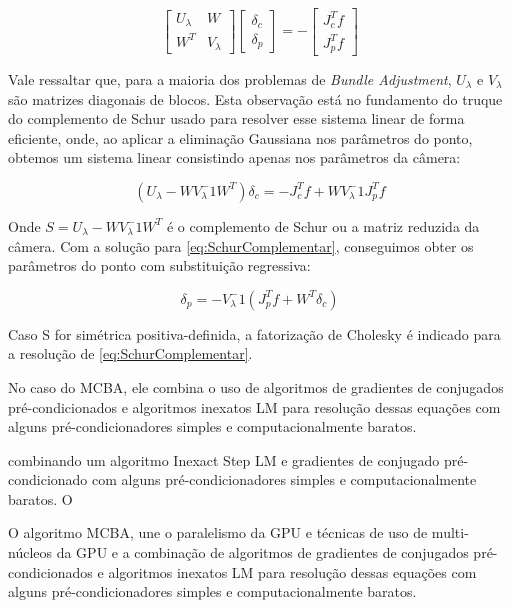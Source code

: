 \begin{itemize}
\[
\begin{bmatrix}
U_\lambda & W \\
W^T & V_\lambda 
\end{bmatrix}
\begin{bmatrix}
\delta_c\\ 
\delta_p
\end{bmatrix} =
-\begin{bmatrix}
J_c^T f\\ 
J_p^T f
\end{bmatrix}
\]

Vale ressaltar que, para a maioria dos problemas de \textit{Bundle Adjustment}, $U_\lambda$ e $V_\lambda$ são matrizes diagonais de blocos. Esta observação está no fundamento do truque do complemento de Schur usado para resolver esse sistema linear de forma eficiente, onde, ao aplicar a eliminação Gaussiana nos parâmetros do ponto, obtemos um sistema linear consistindo apenas nos parâmetros da câmera:

\begin{equation}
\label{eq:SchurComplementar}
(U_\lambda - W V_\lambda^-1 W^T)\delta_c = -J_c^T f + WV_\lambda^-1 J_p^T f
\end{equation}

Onde $S = U_\lambda - W V_\lambda^-1 W^T$ é o complemento de Schur ou a matriz reduzida da câmera. Com a solução para \ref{eq:SchurComplementar}, conseguimos obter os parâmetros do ponto com substituição regressiva:

\begin{equation}
\delta_p = -V_\lambda^-1(J_p^T f + W^T \delta_c)
\end{equation}

Caso S for simétrica positiva-definida, a fatorização de Cholesky é indicado para a resolução de \ref{eq:SchurComplementar}. 

No caso do MCBA, ele combina o uso de algoritmos de gradientes de conjugados pré-condicionados e algoritmos inexatos LM para resolução dessas equações  com alguns pré-condicionadores simples e computacionalmente baratos. 

combinando um algoritmo Inexact Step LM e gradientes de conjugado pré-condicionado com alguns pré-condicionadores simples e computacionalmente baratos. O

O algoritmo MCBA, une o paralelismo da GPU e técnicas de uso de multi-núcleos da GPU e a combinação  de algoritmos de gradientes de conjugados pré-condicionados e algoritmos inexatos LM para resolução dessas equações  com alguns pré-condicionadores simples e computacionalmente baratos. 




\end{itemize}
